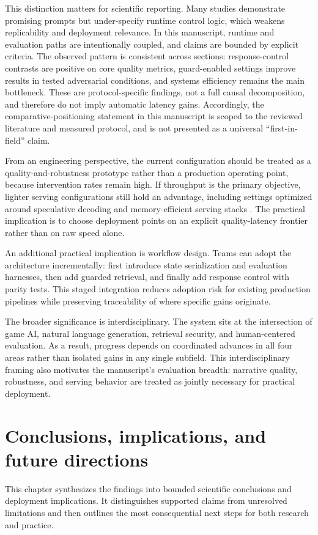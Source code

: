 ﻿\documentclass[a4paper,12pt]{article}
\begin{document}
This distinction matters for scientific reporting. Many studies demonstrate promising prompts but under-specify runtime control logic, which weakens replicability and deployment relevance. In this manuscript, runtime and evaluation paths are intentionally coupled, and claims are bounded by explicit criteria. The observed pattern is consistent across sections: response-control contrasts are positive on core quality metrics, guard-enabled settings improve results in tested adversarial conditions, and systems efficiency remains the main bottleneck. These are protocol-specific findings, not a full causal decomposition, and therefore do not imply automatic latency gains.
Accordingly, the comparative-positioning statement in this manuscript is scoped to the reviewed literature and measured protocol, and is not presented as a universal ``first-in-field'' claim.

From an engineering perspective, the current configuration should be treated as a quality-and-robustness prototype rather than a production operating point, because intervention rates remain high. If throughput is the primary objective, lighter serving configurations still hold an advantage, including settings optimized around speculative decoding and memory-efficient serving stacks \cite{Leviathan2022SpecDec,Kwon2023vLLM}. The practical implication is to choose deployment points on an explicit quality-latency frontier rather than on raw speed alone.

An additional practical implication is workflow design. Teams can adopt the architecture incrementally: first introduce state serialization and evaluation harnesses, then add guarded retrieval, and finally add response control with parity tests. This staged integration reduces adoption risk for existing production pipelines while preserving traceability of where specific gains originate.

The broader significance is interdisciplinary. The system sits at the intersection of game AI, natural language generation, retrieval security, and human-centered evaluation. As a result, progress depends on coordinated advances in all four areas rather than isolated gains in any single subfield. This interdisciplinary framing also motivates the manuscript's evaluation breadth: narrative quality, robustness, and serving behavior are treated as jointly necessary for practical deployment.

\section{Conclusions, implications, and future directions}
This chapter synthesizes the findings into bounded scientific conclusions and deployment implications. It distinguishes supported claims from unresolved limitations and then outlines the most consequential next steps for both research and practice.
\end{document}
